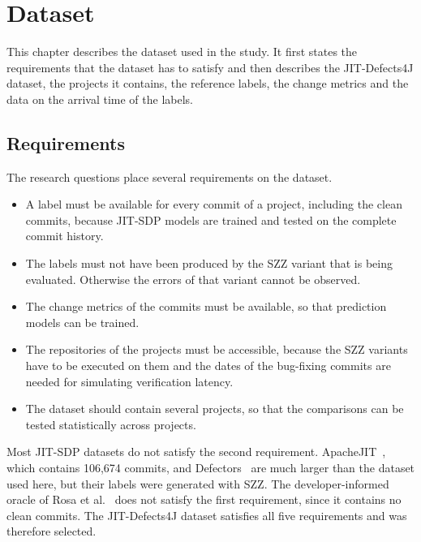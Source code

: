 \documentclass[12pt,a4paper,oneside]{report}
\begin{document}
\chapter{Dataset}\label{ch:data}

This chapter describes the dataset used in the study. It first states the
requirements that the dataset has to satisfy and then describes the
JIT-Defects4J dataset, the projects it contains, the reference labels, the
change metrics and the data on the arrival time of the labels.

\section{Requirements}

The research questions place several requirements on the dataset.

\begin{itemize}[leftmargin=*]
\item A label must be available for every commit of a project, including the
clean commits, because JIT-SDP models are trained and tested on the complete
commit history.
\item The labels must not have been produced by the SZZ variant that is being
evaluated. Otherwise the errors of that variant cannot be observed.
\item The change metrics of the commits must be available, so that prediction
models can be trained.
\item The repositories of the projects must be accessible, because the SZZ
variants have to be executed on them and the dates of the bug-fixing commits
are needed for simulating verification latency.
\item The dataset should contain several projects, so that the comparisons
can be tested statistically across projects.
\end{itemize}

Most JIT-SDP datasets do not satisfy the second requirement.
ApacheJIT~\cite{keshavarz2022apachejit}, which contains 106,674 commits, and
Defectors~\cite{mahbub2023defectors} are much larger than the dataset used
here, but their labels were generated with SZZ. The developer-informed oracle
of Rosa et al.~\cite{rosa2021oracle} does not satisfy the first requirement,
since it contains no clean commits. The JIT-Defects4J dataset satisfies all
five requirements and was therefore selected.
\end{document}
